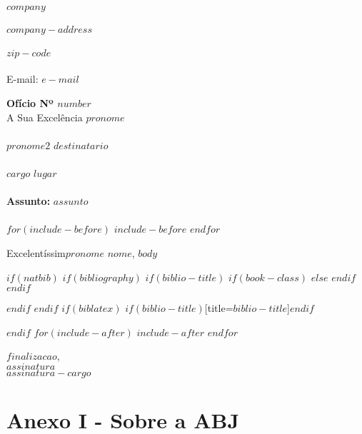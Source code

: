 \documentclass{article}
\begin{document}

\begin{centering}
\textbf{ }\\
\textbf{$company$} \\
\textbf{ }\\
$company-address$ \\
\textbf{ }\\
$zip-code$ \\
\textbf{ }\\
E-mail: \href{mailto:$e-mail$}{$e-mail$} \\
\end{centering}

\vspace{4em}
\noindent\textbf{Ofício Nº $number$} \\
\textbf{}
A Sua Excelência $pronome$ \\
\texbf{} \\
$pronome2$ $destinatario$ \\
\textbf{} \\
$cargo$ $lugar$ \\
\texbf{} \\
\textbf{Assunto:} $assunto$ \\ \\

$for(include-before)$
$include-before$
$endfor$

Excelentíssim$pronome$ $nome$,
$body$

$if(natbib)$
$if(bibliography)$
$if(biblio-title)$
$if(book-class)$
\renewcommand\bibname{$biblio-title$}
$else$
\renewcommand\refname{$biblio-title$}
$endif$
$endif$


$endif$
$endif$
$if(biblatex)$
\printbibliography$if(biblio-title)$[title=$biblio-title$]$endif$

$endif$
$for(include-after)$
$include-after$
$endfor$

\vfill
\begin{flushright}
  $finalizacao$, \\
  \vspace{2em}
  $assinatura$ \\
  $assinatura-cargo$
\end{flushright}

\clearpage

\section{Anexo I - Sobre a ABJ}
\end{document}
